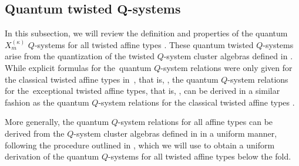 \documentclass[10pt,a4paper]{amsart}
\numberwithin{equation}{section}
\begin{document}
\subsection[Quantum twisted Q-systems]{Quantum twisted $\boldsymbol{ Q}$-systems}\label{Section 4.1}

In this subsection, we will review the definition and properties of the quantum $X_m^{(\kappa)}$ $Q$-systems for all twisted affine types . These quantum twisted $Q$-systems arise from the quantization of the twisted $Q$-system cluster algebras defined in \cite{Williams15}. While explicit formulas for the~quantum  $Q$-system relations were only given for the classical twisted affine types in~\cite[equations~(4.2)--(4.4)]{DFK24}, that is, , the quantum  $Q$-system relations for the~exceptional twisted affine types, that is, , can be derived in a similar fashion as the quantum  $Q$-system relations for the classical twisted affine types .

More generally, the quantum  $Q$-system relations for all affine types  can be derived from the $Q$-system cluster algebras defined in \cite{DFK09,Kedem08,Williams15} in a uniform manner, following the procedure outlined in \cite[Remark 4.2]{DFK24}, which we will use to obtain a uniform derivation of the quantum  $Q$-systems for all twisted affine types  below the fold.
\end{document}
